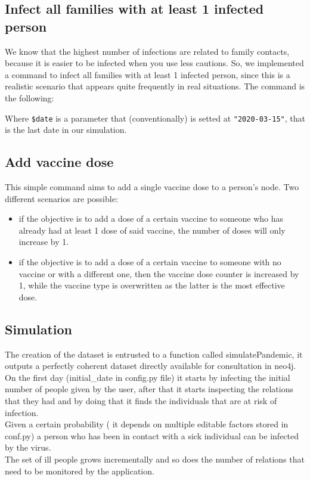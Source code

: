 \documentclass{article}
\newenvironment{code}{\captionsetup{type=listing}}{}
\begin{document}
		\subsection{Infect all families with at least 1 infected person}
		We know that the highest number of infections are related to family contacts, because it is easier to be infected when you use less cautions. So, we implemented a command to infect all families with at least 1 infected person, since this is a realistic scenario that appears quite frequently in real situations. The command is the following:
		\begin{code}
		\end{code}
		
		Where \texttt{\$date} is a parameter that (conventionally) is setted at \texttt{"2020-03-15"}, that is the last date in our
		simulation.
		\subsection{Add vaccine dose}
		\begin{code}
		\end{code}
		This simple command aims to add a single vaccine dose to a person's node. Two different scenarios are possible:
		\begin{itemize}
			\item if the objective is to add a dose of a certain vaccine to someone who has already had at least 1 dose of said vaccine, the number of doses will only increase by 1.
			\item if the objective is to add a dose of a certain vaccine to someone with no vaccine or with a different one, then the vaccine dose counter is increased by 1, while the vaccine type is overwritten as the latter is the most effective dose.
		\end{itemize}
				
		\subsection{Simulation}\label{sim}
		The creation of the dataset is entrusted to a function called simulatePandemic, it outputs a perfectly coherent dataset directly available for consultation in neo4j.\\
		On the first day (initial\_date in config.py file) it starts by infecting the initial number of people given by the user, after that it starts inspecting the relations that they had and by doing that it finds the individuals that are at risk of infection.\\
		Given a certain probability ( it depends on multiple editable factors stored in conf.py) a person who has been in contact with a sick individual can be infected by the virus.\\
		The set of ill people grows incrementally and so does the number of relations that need to be monitored by the application.
			\begin{code}
		\end{code}
						  
\end{document}

